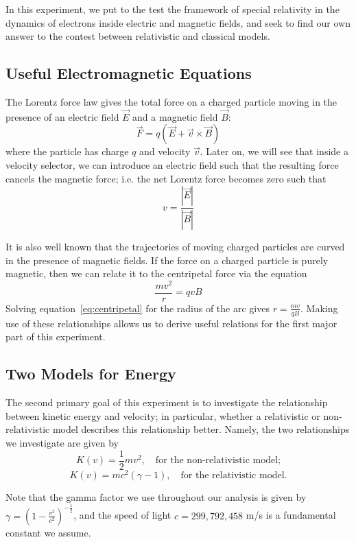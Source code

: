 \documentclass[aps,twocolumn,secnumarabic,balancelastpage,amsmath,amssymb,nofootinbib, floatfix]{revtex4-2}
\begin{document}
	In this experiment, we put to the test the framework of special relativity in the dynamics of electrons inside electric and magnetic fields, and seek to find our own answer to the contest between relativistic and classical models. 
	
	\subsection{Useful Electromagnetic Equations}
	The Lorentz force law gives the total force on a charged particle moving in the presence of an electric field $\vec{E}$ and a magnetic field $\vec{B}$:
	\begin{equation}\label{eq:lorentz}
		\vec{F} = q(\vec{E} + \vec{v} \times \vec{B})
	\end{equation}
	where the particle has charge $q$ and velocity $\vec{v}$. 
	Later on, we will see that inside a velocity selector, we can introduce an electric field such that the resulting force cancels the magnetic force; i.e. the net Lorentz force becomes zero such that
	\begin{equation}\label{eq:velocity}
		v=\frac{|\vec{E}|}{|\vec{B}|}
	\end{equation}
	
	It is also well known that the trajectories of moving charged particles are curved in the presence of magnetic fields. If the force on a charged particle is purely magnetic, then we can relate it to the centripetal force via the equation
	\begin{equation}\label{eq:centripetal}
		\frac{mv^{2}}{r}=qvB
	\end{equation}
	Solving equation~\ref{eq:centripetal} for the radius of the arc gives $r=\frac{mv}{qB}$.
	Making use of these relationships allows us to derive useful relations for the first major part of this experiment. 
	
	\subsection{Two Models for Energy}
	The second primary goal of this experiment is to investigate the relationship between kinetic energy and velocity; in particular, whether a relativistic or non-relativistic model describes this relationship better. Namely, the two relationships we investigate are given by 
	$$K(v)=\frac{1}{2}mv^{2}, \quad \text{for the non-relativistic model;}$$
	$$K(v)=mc^{2}(\gamma-1), \quad \text{for the relativistic model.}$$
		
	Note that the gamma factor we use throughout our analysis is given by $\gamma=(1-\frac{v^{2}}{c^{2}})^{-\frac{1}{2}}$, and the speed of light $c=299,792,458$ m/s is a fundamental constant we assume.
	
\end{document}
